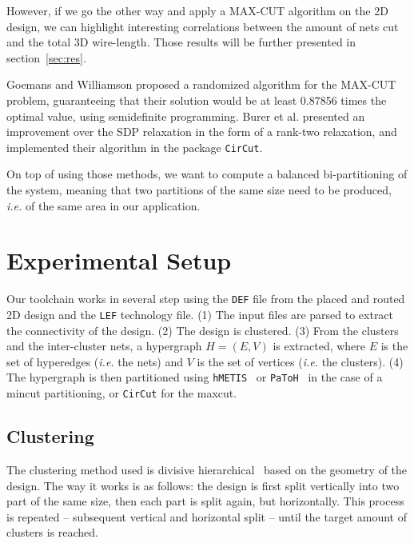 \documentclass[conference]{IEEEtran}
\begin{document}
However, if we go the other way and apply a MAX-CUT algorithm on the 2D design, we can highlight interesting correlations between the amount of nets cut and the total 3D wire-length.
Those results will be further presented in section~\ref{sec:res}.



Goemans and Williamson \cite{Goemans1995} proposed a randomized algorithm for the MAX-CUT problem, guaranteeing that their solution would be at least 0.87856 times the optimal value, using semidefinite programming. Burer et al. \cite{Burer2000} presented an improvement over the SDP relaxation in the form of a rank-two relaxation, and implemented their algorithm in the package \texttt{CirCut}.

On top of using those methods, we want to compute a balanced bi-partitioning of the system, meaning that two partitions of the same size need to be produced, \textit{i.e.} of the same area in our application.



\section{Experimental Setup}

Our toolchain works in several step using the \texttt{DEF} file from the placed and routed 2D design and the \texttt{LEF} technology file.
(1) The input files are parsed to extract the connectivity of the design.
(2) The design is clustered.
(3) From the clusters and the inter-cluster nets, a hypergraph $H = (E, V)$ is extracted, where $E$ is the set of hyperedges (\textit{i.e.} the nets) and $V$ is the set of vertices (\textit{i.e.} the clusters).
(4) The hypergraph is then partitioned using \texttt{hMETIS}~\cite{Karypis1999} or \texttt{PaToH}~\cite{Aykanat2011} in the case of a mincut partitioning, or \texttt{CirCut} for the maxcut.

\subsection{Clustering}
The clustering method used is divisive hierarchical~\cite{Rokach2005} based on the geometry of the design.
The way it works is as follows: the design is first split vertically into two part of the same size, then each part is split again, but horizontally.
This process is repeated -- subsequent vertical and horizontal split -- until the target amount of clusters is reached.
\end{document}
